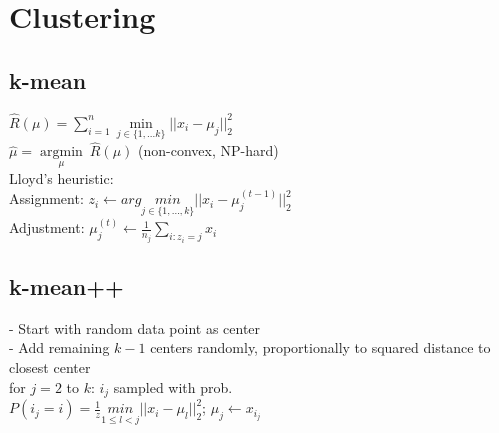 \section*{Clustering}
\subsection*{k-mean}

$\hat{R}(\mu) = \sum_{i=1}^n \underset{j\in\{1,...k\}}{\operatorname{min}}||x_i-\mu_j||_2^2$\\
$\hat{\mu} =  \underset{\mu}{\operatorname{argmin}} ~ \hat{R}(\mu)$ (non-convex, NP-hard)\\
Lloyd's heuristic:\\
Assignment: $z_i \leftarrow arg \underset{j\in\{1,...,k\}}{min}||x_i - \mu_j^{(t-1)}||_2^2$\\
Adjustment: $\mu_j^{(t)} \leftarrow \frac{1}{n_j}\sum_{i:z_i=j}x_i$

\subsection*{k-mean++}
- Start with random data point as center\\
- Add remaining $k-1$ centers randomly, proportionally to squared distance to closest center\\
for $j=2$ to $k$:
$i_j$ sampled with prob.\\
$P(i_j=i) = \frac{1}{z} \underset{1\leq l<j}{min}||x_i-\mu_l||_2^2$; $\mu_j \leftarrow x_{i_j}$